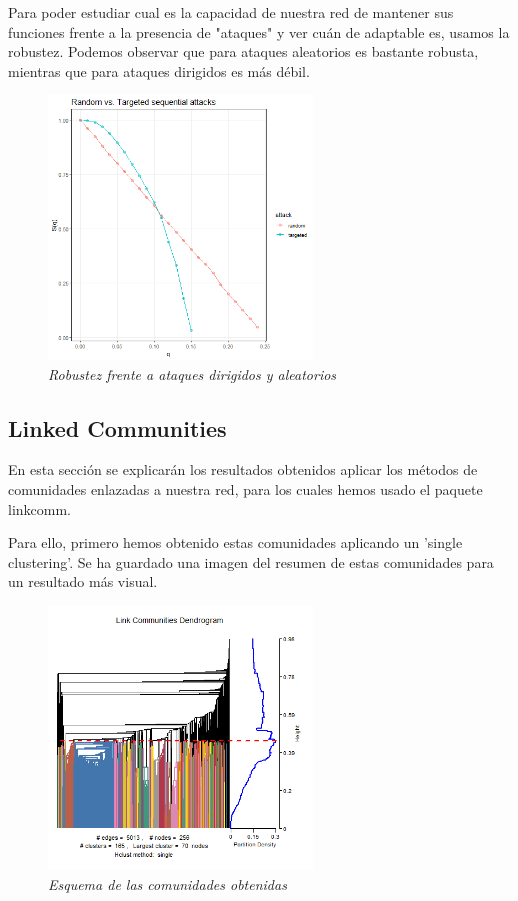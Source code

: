 Para poder estudiar cual es la capacidad de nuestra red de mantener sus funciones frente a la presencia de "ataques" y ver cuán de adaptable es, usamos la robustez. Podemos observar que para ataques aleatorios es bastante robusta, mientras que para ataques dirigidos es más débil. 
\begin{figure}
	\centering
		\includegraphics[width=70mm,scale=1.2]{figures/sequential_attacks.png}
		\caption{\textit{Robustez frente a ataques dirigidos y aleatorios}}
\end{figure}

\subsection{Linked Communities}
En esta sección se explicarán los resultados obtenidos aplicar los métodos de comunidades enlazadas a nuestra red, para los cuales hemos usado el paquete linkcomm.

Para ello, primero hemos obtenido estas comunidades aplicando un 'single clustering'. Se ha guardado una imagen del resumen de estas comunidades para un resultado más visual.

 \begin{figure}
 	\centering
 	\includegraphics[width=70mm,scale=1.2]{figures/covid_lc_summary.png}
 	\caption{\textit{Esquema de las comunidades obtenidas}}
 \end{figure}


